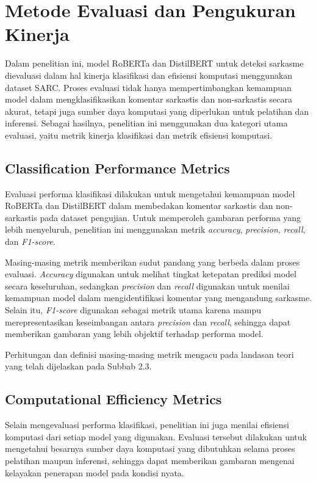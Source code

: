 \section{Metode Evaluasi dan Pengukuran Kinerja}

Dalam penelitian ini, model RoBERTa dan DistilBERT untuk deteksi sarkasme dievaluasi dalam hal kinerja klasifikasi dan efisiensi komputasi menggunakan dataset SARC. Proses evaluasi tidak hanya mempertimbangkan kemampuan model dalam mengklasifikasikan komentar sarkastis dan non-sarkastis secara akurat, tetapi juga sumber daya komputasi yang diperlukan untuk pelatihan dan inferensi. Sebagai hasilnya, penelitian ini menggunakan dua kategori utama evaluasi, yaitu metrik kinerja klasifikasi dan metrik efisiensi komputasi.

\subsection{Classification Performance Metrics}

Evaluasi performa klasifikasi dilakukan untuk mengetahui kemampuan model RoBERTa dan DistilBERT dalam membedakan komentar sarkastis dan non-sarkastis pada dataset pengujian. Untuk memperoleh gambaran performa yang lebih menyeluruh, penelitian ini menggunakan metrik \textit{accuracy}, \textit{precision}, \textit{recall}, dan \textit{F1-score}.

Masing-masing metrik memberikan sudut pandang yang berbeda dalam proses evaluasi. \textit{Accuracy} digunakan untuk melihat tingkat ketepatan prediksi model secara keseluruhan, sedangkan \textit{precision} dan \textit{recall} digunakan untuk menilai kemampuan model dalam mengidentifikasi komentar yang mengandung sarkasme. Selain itu, \textit{F1-score} digunakan sebagai metrik utama karena mampu merepresentasikan keseimbangan antara \textit{precision} dan \textit{recall}, sehingga dapat memberikan gambaran yang lebih objektif terhadap performa model.

Perhitungan dan definisi masing-masing metrik mengacu pada landasan teori yang telah dijelaskan pada Subbab 2.3.

\subsection{Computational Efficiency Metrics}

Selain mengevaluasi performa klasifikasi, penelitian ini juga menilai efisiensi komputasi dari setiap model yang digunakan. Evaluasi tersebut dilakukan untuk mengetahui besarnya sumber daya komputasi yang dibutuhkan selama proses pelatihan maupun inferensi, sehingga dapat memberikan gambaran mengenai kelayakan penerapan model pada kondisi nyata.

